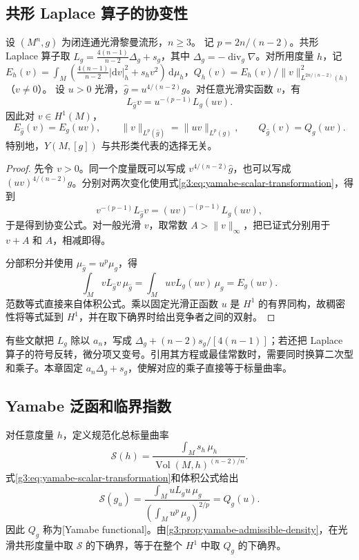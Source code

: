 \subsection{共形 Laplace 算子的协变性}
\label{g3:subsec:2402:02}
\begin{proposition}\label{g3:prop:conformal-laplacian-covariance}
	设 \((M^n,g)\) 为闭连通光滑黎曼流形，\(n\ge3\)。
	记 \(p=2n/(n-2)\)。共形 Laplace 算子取 \(L_g=\tfrac{4(n-1)}{n-2}\Delta_g+s_g\)，其中 \(\Delta_g=-\operatorname{div}_g\nabla\)。对所用度量 \(h\)，记 \(E_h(v)=\int_M(\tfrac{4(n-1)}{n-2}|\mathrm dv|_h^2+s_hv^2)\,\mathrm d\mu_h\)，\(Q_h(v)=E_h(v)/\|v\|_{L^{2n/(n-2)}(h)}^2\)（\(v\ne0\)）。
	设 \(u>0\) 光滑，\(\widehat g=u^{4/(n-2)}g\)。对任意光滑实函数 \(v\)，有
	\begin{equation}\label{g3:eq:conformal-laplacian-covariance}
		L_{\widehat g}v=u^{-(p-1)}L_g(uv).
	\end{equation}
	因此对 \(v\in H^1(M)\)，
	\begin{equation}\label{g3:eq:yamabe-conformal-energy}
		E_{\widehat g}(v)=E_g(uv),\qquad
		\|v\|_{L^p(\widehat g)}=\|uv\|_{L^p(g)},\qquad
		Q_{\widehat g}(v)=Q_g(uv).
	\end{equation}
	特别地，\(Y(M,[g])\) 与共形类代表的选择无关。
\end{proposition}
\begin{proof}
	先令 \(v>0\)。同一个度量既可以写成 \(v^{4/(n-2)}\widehat g\)，也可以写成 \((uv)^{4/(n-2)}g\)。分别对两次变化使用式\eqref{g3:eq:yamabe-scalar-transformation}，得到
	\[
		v^{-(p-1)}L_{\widehat g}v=(uv)^{-(p-1)}L_g(uv),
	\]
	于是得到协变公式。对一般光滑 \(v\)，取常数 \(A>\|v\|_\infty\)，把已证式分别用于 \(v+A\) 和 \(A\)，相减即得。

	分部积分并使用 \(\mu_{\widehat g}=u^p\mu_g\)，得
	\[
		\int_M vL_{\widehat g}v\,\mu_{\widehat g}
		=\int_MuvL_g(uv)\,\mu_g=E_g(uv).
	\]
	范数等式直接来自体积公式。乘以固定光滑正函数 \(u\) 是 \(H^1\) 的有界同构，故稠密性将等式延到 \(H^1\)，并在取下确界时给出竞争者之间的双射。
\end{proof}

有些文献把 \(L_g\) 除以 \(a_n\)，写成 \(\Delta_g+(n-2)s_g/[4(n-1)]\)；若还把 Laplace 算子的符号反转，微分项又变号。引用其方程或最佳常数时，需要同时换算二次型和乘子。本章固定 \(a_n\Delta_g+s_g\)，使解对应的乘子直接等于标量曲率。

\subsection{Yamabe 泛函和临界指数}
\label{g3:subsec:2402:03}
对任意度量 \(h\)，定义规范化总标量曲率
\[
	\mathcal S(h)=\frac{\int_Ms_h\,\mu_h}
	{\operatorname{Vol}(M,h)^{(n-2)/n}}.
\]
式\eqref{g3:eq:yamabe-scalar-transformation}和体积公式给出
\begin{equation}\label{g3:eq:yamabe-geometric-functional}
	\mathcal S(g_u)
	=\frac{\int_MuL_gu\,\mu_g}{(\int_Mu^p\,\mu_g)^{2/p}}
	=Q_g(u).
\end{equation}
因此 \(Q_g\) 称为[Yamabe functional]。由\cref{g3:prop:yamabe-admissible-density}，在光滑共形度量中取 \(\mathcal S\) 的下确界，等于在整个 \(H^1\) 中取 \(Q_g\) 的下确界。

